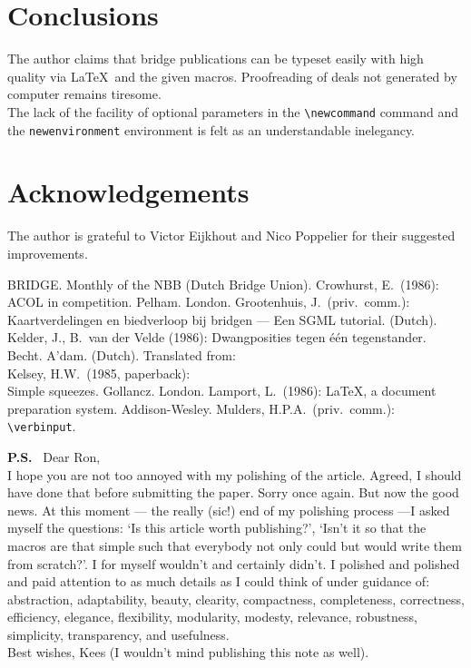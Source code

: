 \section*{Conclusions}
The author claims that bridge publications can be typeset easily
with high quality via \LaTeX\ and the given macros.
Proofreading of deals not generated by computer remains
tiresome.\\
The lack of the facility of optional parameters in the
\verb=\newcommand= command and the \verb=newenvironment=
environment is felt as an understandable inelegancy.
%
\section*{Acknowledgements}
The author is grateful to Victor Eijkhout and Nico Poppelier
for their suggested improvements.
%
\begin{thebibliography}{99}
 BRIDGE. Monthly of the NBB (Dutch
Bridge Union).
 Crowhurst, E.\ (1986):
ACOL in competition. Pelham. London.
Grootenhuis, J.\ (priv.\ comm.):
Kaartverdelingen en biedverloop bij bridgen
--- Een SGML tutorial. (Dutch).
Kelder, J., B.\ van der Velde (1986):
Dwangposities tegen \'e\'en tegenstander. Becht. A'dam. (Dutch).
Translated from:\\
Kelsey, H.W.\ (1985, paperback):\\
Simple squeezes. Gollancz. London.
 Lamport, L.\ (1986):
\LaTeX, a document preparation system. Addison-Wesley.
Mulders, H.P.A.\ (priv.\ comm.):
\verb=\verbinput=.
\end{thebibliography}
{\bf P.S.} \ Dear Ron,\\
I hope you are not too annoyed with my polishing of the article.
Agreed, I should have done that before submitting the paper.
Sorry once again.
But now the good news. At this moment --- the really (sic!) end of my
polishing process ---I asked myself the questions: `Is this article
worth publishing?', `Isn't it so that the macros are that simple such that
everybody not only could but would write them from scratch?'.
I for myself wouldn't and certainly didn't.
I polished and polished and paid attention to as much details as I
could think of under guidance of: abstraction, adaptability,
beauty, clearity, compactness, completeness, correctness, efficiency,
elegance, flexibility, modularity, modesty, relevance, robustness,
simplicity, transparency, and usefulness. \\
Best wishes,
Kees (I wouldn't mind publishing this note as well).

%
 
 
